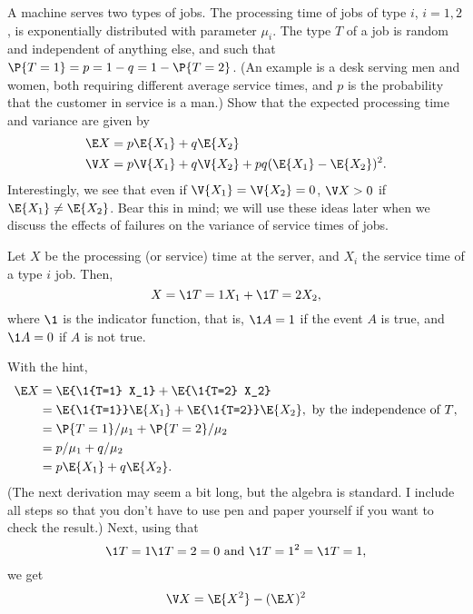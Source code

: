 \begin{exercise}
  A machine serves two types of jobs. The processing time of jobs of
  type $i$, $i=1,2$, is exponentially distributed with parameter
  $\mu_i$. The type $T$ of a job is random and independent of anything
  else, and such that $\P{T=1} = p = 1-q = 1-\P{T=2}$. (An example
  is a desk serving men and women, both requiring different average
  service times, and $p$ is the probability that the customer in
  service is a man.)  Show that  the expected processing time  and  variance are given by
\begin{align*}
  \E X &= p \E{X_1}  + q \E{X_2} \\
\V X &= p \V{X_1} + q \V{X_2} + pq(\E{X_1} - \E{X_2})^2.
  \end{align*}
Interestingly, we see that even if $\V{X_1} = \V{X_2} = 0$, $\V X > 0$
if $\E{X_1} \neq \E{X_2}$. Bear this in mind; we will use these ideas
later when we discuss the effects of failures on the variance of
service times of jobs.
\begin{hint}
    Let $X$ be the processing (or service) time at the server, and
    $X_i$ the service time of a type $i$ job. Then, 
    \begin{equation*}
      X = \1{T=1} X_1 + \1{T=2} X_2,
    \end{equation*}
    where $\1{}$ is the indicator function, that is, $\1{A}=1$ if the
    event $A$ is true, and $\1{A}=0$ if $A$ is not true.   
\end{hint}
  \begin{solution}
With the hint, 
\begin{align*}
  \E X 
&= \E{\1{T=1} X_1} + \E{\1{T=2} X_2} \\
&= \E{\1{T=1}} \E{ X_1} + \E{\1{T=2}} \E{X_2}, \text{ by the independence of $T$}, \\
&= \P{T=1} /\mu_1 + \P{T=2}/ \mu_2 \\
&= p /\mu_1 + q/ \mu_2 \\
&= p \E{X_1}  + q \E{X_2}.
\end{align*}
(The next derivation may seem a bit long, but the algebra is
standard. I include all steps so that you don't have to use pen and
paper yourself if you want to check the result.) Next, using that
\begin{equation*}
\1{T=1}\1{T=2} = 0 \text{ and } \1{T=1}^2 = \1{T=1},
\end{equation*}
we get
\begin{align*}
  \V X 
&= \E{X^2} - (\E X)^2 \\

\end{align*}
\end{solution}
\end{exercise}
